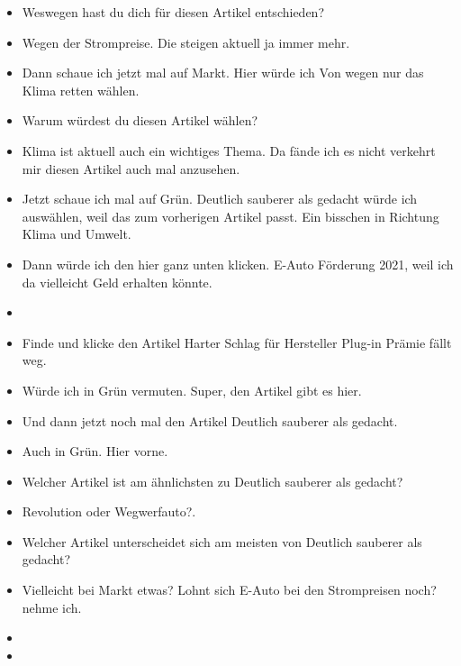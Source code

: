 {\begin{itemize}[]
            \item {} Weswegen hast du dich für diesen Artikel entschieden?
            \item {} Wegen der Strompreise. Die steigen aktuell ja immer mehr.
            \item {} Dann schaue ich jetzt mal auf Markt.
                  Hier würde ich \flqq Von wegen nur das Klima retten\frqq{} wählen.
            \item {} Warum würdest du diesen Artikel wählen?
            \item {} Klima ist aktuell auch ein wichtiges Thema. Da fände ich es nicht verkehrt mir diesen Artikel auch mal anzusehen.
            \item {} Jetzt schaue ich mal auf Grün.
                  \flqq Deutlich sauberer als gedacht\frqq{} würde ich auswählen, weil das zum vorherigen Artikel passt.
                  Ein bisschen in Richtung Klima und Umwelt.
            \item {} Dann würde ich den hier ganz unten klicken. \flqq E-Auto Förderung 2021\frqq{}, weil ich da vielleicht Geld erhalten könnte.
            \item {}
            \item {} Finde und klicke den Artikel \flqq Harter Schlag für Hersteller Plug-in Prämie fällt weg\frqq{}.
            \item {} Würde ich in Grün vermuten. Super, den Artikel gibt es hier.
            \item {} Und dann jetzt noch mal den Artikel \flqq Deutlich sauberer als gedacht\frqq{}.
            \item {} Auch in Grün. Hier vorne.
            \item {} Welcher Artikel ist am ähnlichsten zu \flqq Deutlich sauberer als gedacht\frqq{}?
            \item {} \flqq Revolution oder Wegwerfauto?\frqq{}.
            \item {} Welcher Artikel unterscheidet sich am meisten von \flqq Deutlich sauberer als gedacht\frqq{}?
            \item {} Vielleicht bei Markt etwas?
                  \flqq Lohnt sich E-Auto bei den Strompreisen noch?\frqq{} nehme ich.
            \item {}
            \item {}

\end{itemize}}
